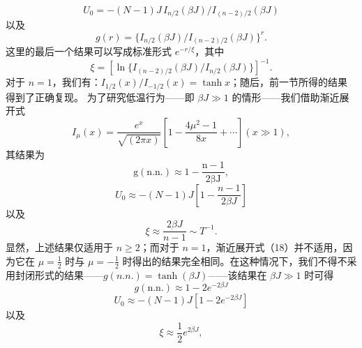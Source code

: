 \begin{equation}\tag{13.1.66}\label{eq:13.1.66}
U _ { 0 } = - ( N - 1 ) J \, I _ { n / 2 } ( \beta J ) / I _ { ( n - 2 ) / 2 } ( \beta J )
\end{equation}
以及
\begin{equation}\tag{13.1.67}\label{eq:13.1.67}
g ( r ) = \{ I _ { n / 2 } ( \beta J ) / I _ { ( n - 2 ) / 2 } ( \beta J ) \} ^{r} .
\end{equation}
这里的最后一个结果可以写成标准形式 \(e^{-r/\xi}\)，其中
\begin{equation}\tag{13.1.68}\label{eq:13.1.68}
\xi = [ \ln \{ I _ { ( n - 2 ) / 2 } ( \beta J ) / I _ { n / 2 } ( \beta J ) \} ] ^{- 1} .
\end{equation}
对于 \(n=1\)，我们有：\(I_{1/2}(x)/I_{-1/2}(x)=\tanh x\)；随后，前一节所得的结果得到了正确复现。
为了研究低温行为——即 \(\beta J \gg 1\) 的情形——我们借助渐近展开式
\begin{equation}\tag{13.1.69}\label{eq:13.1.69}
I _ { \mu } ( x ) = \frac { e ^{x} } { \sqrt { ( 2 \pi x ) } } \left[ 1 - \frac { 4 \mu ^{2} - 1 } { 8 x } + \cdots \right]  ( x \gg 1 ) ,
\end{equation}
其结果为
\begin{equation}\tag{13.1.70}\label{eq:13.1.70}
\mathrm { g ( n . n . ) \approx 1 - \frac { n - 1 } { 2 \beta J } , }
\end{equation}
\begin{equation}\tag{13.1.71}\label{eq:13.1.71}
U _ { 0 } \approx - ( N - 1 ) J \left[ 1 - \frac { n - 1 } { 2 \beta J } \right]
\end{equation}
以及
\begin{equation}\tag{13.1.72}\label{eq:13.1.72}
\xi \approx \frac { 2 \beta J } { n - 1 } \sim T ^{- 1} .
\end{equation}
显然，上述结果仅适用于 \(n \geq 2\)；而对于 \(n=1\)，渐近展开式（18）并不适用，因为它在 \(\mu=\frac{1}{2}\) 时与 \(\mu=-\frac{1}{2}\) 时得出的结果完全相同。在这种情况下，我们不得不采用封闭形式的结果——\(g(n.n.)=\tanh(\beta J)\)——该结果在 \(\beta J \gg 1\) 时可得
\begin{equation}\tag{13.1.73}\label{eq:13.1.73}
g ( \mathrm { n . n . } ) \approx 1 - 2 e ^{- 2 \beta J}
\end{equation}
\begin{equation}\tag{13.1.74}\label{eq:13.1.74}
U _ { 0 } \approx - ( N - 1 ) J [ 1 - 2 e ^{- 2 \beta J} ]
\end{equation}
以及
\begin{equation}\tag{13.1.75}\label{eq:13.1.75}
\xi \approx \frac { 1 } { 2 } e ^{2 \beta J} ,
\end{equation}

